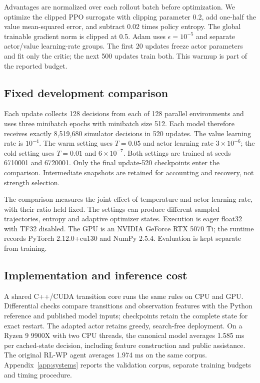Advantages are normalized over each rollout batch before optimization.
We optimize the clipped PPO surrogate \cite{schulman2017ppo} with clipping
parameter 0.2, add
one-half the value mean-squared error, and subtract 0.02 times policy entropy.
The global trainable gradient norm is clipped at 0.5. Adam uses
$\epsilon=10^{-5}$ and separate actor/value learning-rate groups. The first
20 updates freeze actor parameters and fit only the critic; the next 500
updates train both. This warmup is part of the reported budget.

\subsection{Fixed development comparison}
Each update collects 128 decisions from each of 128 parallel environments and
uses three minibatch epochs with minibatch size 512. Each model therefore
receives exactly 8,519,680 simulator decisions in 520 updates. The value
learning rate is $10^{-4}$. The warm setting uses $T=0.05$ and actor learning
rate $3\times10^{-6}$; the cold setting uses $T=0.01$ and
$6\times10^{-7}$. Both settings are trained at seeds 6710001 and 6720001.
Only the final update-520 checkpoints enter the comparison. Intermediate
snapshots are retained for accounting and recovery, not strength selection.

The comparison measures the joint effect of temperature and actor learning rate,
with their ratio held fixed. The settings can produce different sampled
trajectories, entropy and adaptive optimizer states. Execution is eager float32
with TF32 disabled. The GPU is an
NVIDIA GeForce RTX 5070 Ti; the runtime records PyTorch 2.12.0+cu130 and NumPy
2.5.4. Evaluation is kept separate from training.

\subsection{Implementation and inference cost}
A shared C++/CUDA transition core runs the same rules on CPU and GPU. Differential
checks compare transitions and observation features with the Python reference and
published model inputs; checkpoints retain the complete state for exact restart.
The adapted actor retains greedy, search-free deployment. On a Ryzen 9 9900X
with two CPU threads, the canonical model averages 1.585 ms per cached-state
decision, including feature construction and public assistance. The original
RL-WP agent averages 1.974 ms on the same corpus. Appendix~\ref{app:systems}
reports the validation corpus, separate training budgets and timing procedure.

